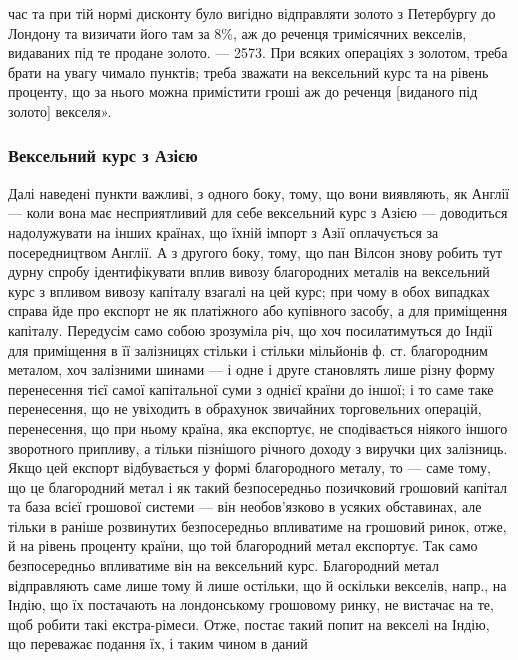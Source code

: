 \parcont{}  %
час та при тій нормі дисконту було вигідно відправляти золото з Петербургу до
Лондону та визичати його там за 8\%, аж до реченця тримісячних векселів, видаваних
під те продане золото. — 2573. При всяких операціях з золотом, треба
брати на увагу чимало пунктів; треба зважати на вексельний курс та на рівень
проценту, що за нього можна примістити гроші аж до реченця [виданого під
золото] векселя».

\subsubsection{Вексельний курс з Азією}

Далі наведені пункти важливі, з одного боку, тому, що вони виявляють,
як Англії — коли вона має несприятливий для себе вексельний курс з Азією —
доводиться надолужувати на інших країнах, що їхній імпорт з Азії оплачується
за посередництвом Англії. А з другого боку, тому, що пан Вілсон знову робить
тут дурну спробу ідентифікувати вплив вивозу благородних металів на вексельний
курс з впливом вивозу капіталу взагалі на цей курс; при чому в обох
випадках справа йде про експорт не як платіжного або купівного засобу, а для
приміщення капіталу. Передусім само собою зрозуміла річ, що хоч посилатимуться
до Індії для приміщення в її залізницях стільки і стільки мільйонів ф. ст. благородним
металом, хоч залізними шинами — і одне і друге становлять лише
різну форму перенесення тієї самої капітальної суми з однієї країни до іншої;
і то саме таке перенесення, що не увіходить в обрахунок звичайних торговельних
операцій, перенесення, що при ньому країна, яка експортує, не сподівається
ніякого іншого зворотного припливу, а тільки пізнішого річного доходу з виручки
цих залізниць. Якщо цей експорт відбувається у формі благородного металу,
то — саме тому, що це благородний метал і як такий безпосередньо позичковий
грошовий капітал та база всієї грошової системи — він необов’язково в
усяких обставинах, але тільки в раніше розвинутих безпосередньо впливатиме
на грошовий ринок, отже, й на рівень проценту країни, що той благородний
метал експортує. Так само безпосередньо впливатиме він на вексельний курс.
Благородний метал відправляють саме лише тому й лише остільки, що й оскільки
векселів, напр., на Індію, що їх постачають на лондонському грошовому ринку,
не вистачає на те, щоб робити такі екстра-рімеси. Отже, постає такий попит
на векселі на Індію, що переважає подання їх, і таким чином в даний
